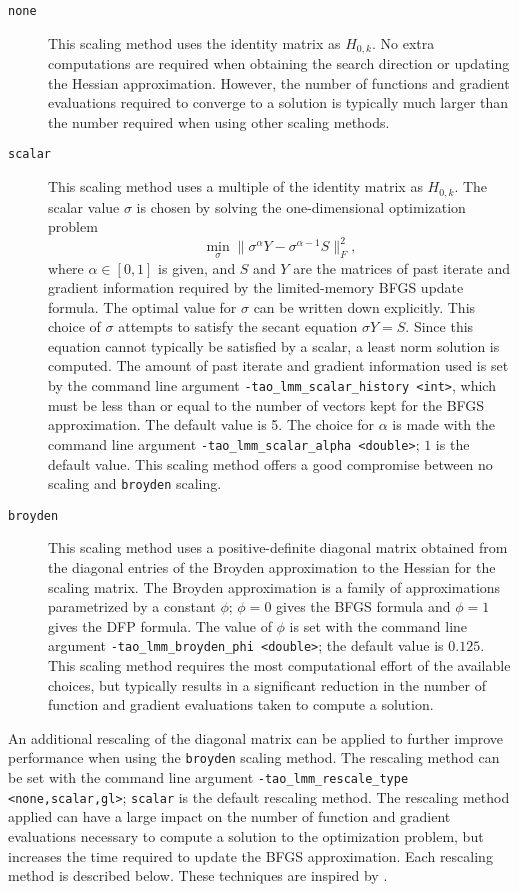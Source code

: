 \begin{description}
\item[{\tt none}]  This scaling method uses the identity matrix as 
$H_{0,k}$.  No extra computations are required when obtaining the 
search direction or updating the Hessian approximation.  However, 
the number of functions and gradient evaluations required to converge
to a solution is typically much larger than the number required when 
using other scaling methods.
\item[{\tt scalar}]  This scaling method uses a multiple of the identity 
matrix as $H_{0,k}$.  The scalar value $\sigma$ is chosen by solving the 
one-dimensional optimization problem
\[
\min_\sigma \|\sigma^\alpha Y - \sigma^{\alpha - 1} S\|_F^2,
\]
where $\alpha \in [0,1]$ is given, and $S$ and $Y$ are the matrices of 
past iterate and gradient information required by the limited-memory
BFGS update formula.  The optimal value for $\sigma$ can be written
down explicitly.  This choice of $\sigma$ attempts to satisfy the 
secant equation $\sigma Y = S$.  Since this equation cannot typically
be satisfied by a scalar, a least norm solution is computed.  The amount 
of past iterate and gradient information used is set by the command line 
argument {\tt -tao\_lmm\_scalar\_history <int>}, which must be less than 
or equal to the number of vectors kept for the BFGS approximation.  
The default value is 5.  The choice for $\alpha$ is made with the command 
line argument {\tt -tao\_lmm\_scalar\_alpha <double>}; $1$ is the default
value.  This scaling method offers a good compromise between no scaling 
and {\tt broyden} scaling.
\item[{\tt broyden}] This scaling method uses a positive-definite diagonal 
matrix obtained from the diagonal entries of the Broyden approximation to 
the Hessian for the scaling matrix.  The Broyden approximation is a 
family of approximations parametrized by a constant $\phi$; $\phi = 0$ 
gives the BFGS formula and $\phi = 1$ gives the DFP formula.  The value 
of $\phi$ is set with the command line argument 
{\tt -tao\_lmm\_broyden\_phi <double>}; the default value is $0.125$.  
This scaling method requires the most computational effort of the
available choices, but typically results in a significant reduction 
in the number of function and gradient evaluations taken to compute a 
solution.
\end{description}

An additional rescaling of the diagonal matrix can be applied to further
improve performance when using the {\tt broyden} scaling method.  The
rescaling method can be set with the command line argument 
{\tt -tao\_lmm\_rescale\_type <none,scalar,gl>}; {\tt scalar} is the 
default rescaling method.  The rescaling method applied can have a large 
impact on the number of function and gradient evaluations necessary to 
compute a solution to the optimization problem, but increases the time
required to update the BFGS approximation.  Each rescaling method is 
described below.  These techniques are inspired by \cite{Gilbert-Lemarechal}.

